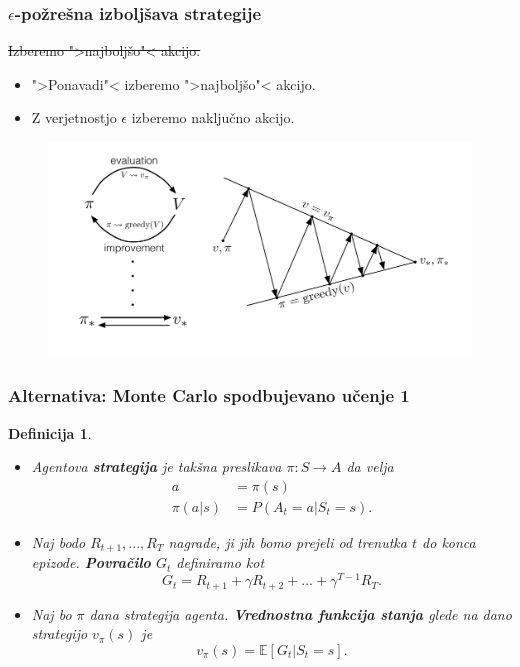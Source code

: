 \documentclass{beamer}    %
\newtheorem{definicija}[izrek]{Definicija}
\begin{document}
\begin{frame}
    \frametitle{$\epsilon$-požrešna izboljšava strategije}
    \pause
    \sout{Izberemo ">najboljšo"< akcijo.}
    \pause
    \medskip

    \begin{itemize}
        \item ">Ponavadi"< izberemo ">najboljšo"< akcijo.
        \item Z verjetnostjo $\epsilon$ izberemo naključno akcijo.
    \end{itemize}

    \begin{figure}
        \includegraphics[scale=0.23]{slike/policy-iteration.png}
    \end{figure}
\end{frame}


\begin{frame}
    \frametitle{Alternativa: Monte Carlo spodbujevano učenje 1}
    \begin{definicija}
        \begin{itemize}
            \item Agentova \textbf{strategija} je takšna preslikava $\pi: S \rightarrow A$
                    da velja 
                    \begin{align*}
                    a &= \pi(s) \\
                    \pi(a | s) &= P(A_t = a | S_t = s). 
                    \end{align*}

            \item Naj bodo $R_{t+1}, ...,R_T$ nagrade, ji jih bomo prejeli od trenutka 
                    $t$ do konca epizode. \textbf{Povračilo} $G_t$ definiramo kot
                    $$
                    G_t = R_{t+1} + \gamma R_{t+2} + ... + \gamma^{T-1} R_T.
                    $$

            \item Naj bo $\pi$ dana strategija agenta. \textbf{Vrednostna funkcija 
                    stanja} glede na dano strategijo $v_\pi(s)$ je
                    $$
                    v_\pi(s) = \mathbb{E} [G_t | S_t = s].
                    $$
        \end{itemize}
    \end{definicija}
\end{frame}
\end{document}
